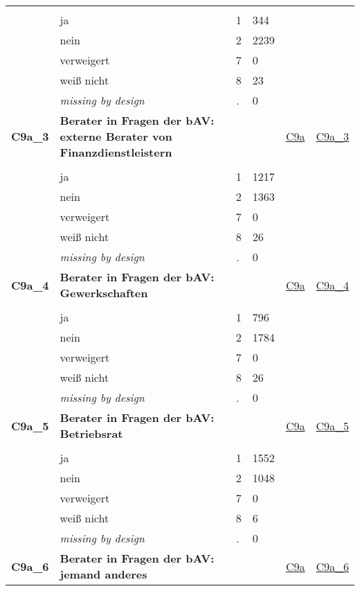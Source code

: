 \begin{longtable}{| L{2.45cm} | L{6cm} | C{1.5cm} | R{1cm} | C{2.25cm} | C{2.25cm} |}
   &  &  &  &  &  \\ 
   & ja & 1 & 344 &  &  \\ 
   & nein & 2 & 2239 &  &  \\ 
   & verweigert & 7 & 0 &  &  \\ 
   & weiß nicht & 8 & 23 &  &  \\ 
   & \textit{missing by design} & \textit{.} & 0 &  &  \\ 
   \midrule
\textbf{C9a\_3}\label{var:C9a:3} & \textbf{Berater in Fragen der bAV: externe Berater von Finanzdienstleistern} &  &  & \hyperref[C9a]{C9a} & \hyperref[var:suf:C9a:3]{C9a\_3} \\ 
   &  &  &  &  &  \\ 
   & ja & 1 & 1217 &  &  \\ 
   & nein & 2 & 1363 &  &  \\ 
   & verweigert & 7 & 0 &  &  \\ 
   & weiß nicht & 8 & 26 &  &  \\ 
   & \textit{missing by design} & \textit{.} & 0 &  &  \\ 
   \midrule
\textbf{C9a\_4}\label{var:C9a:4} & \textbf{Berater in Fragen der bAV: Gewerkschaften} &  &  & \hyperref[C9a]{C9a} & \hyperref[var:suf:C9a:4]{C9a\_4} \\ 
   &  &  &  &  &  \\ 
   & ja & 1 & 796 &  &  \\ 
   & nein & 2 & 1784 &  &  \\ 
   & verweigert & 7 & 0 &  &  \\ 
   & weiß nicht & 8 & 26 &  &  \\ 
   & \textit{missing by design} & \textit{.} & 0 &  &  \\ 
   \midrule
\textbf{C9a\_5}\label{var:C9a:5} & \textbf{Berater in Fragen der bAV: Betriebsrat} &  &  & \hyperref[C9a]{C9a} & \hyperref[var:suf:C9a:5]{C9a\_5} \\ 
   &  &  &  &  &  \\ 
   & ja & 1 & 1552 &  &  \\ 
   & nein & 2 & 1048 &  &  \\ 
   & verweigert & 7 & 0 &  &  \\ 
   & weiß nicht & 8 & 6 &  &  \\ 
   & \textit{missing by design} & \textit{.} & 0 &  &  \\ 
   \midrule
\textbf{C9a\_6}\label{var:C9a:6} & \textbf{Berater in Fragen der bAV: jemand anderes} &  &  & \hyperref[C9a]{C9a} & \hyperref[var:suf:C9a:6]{C9a\_6} \\ 

\end{longtable}
